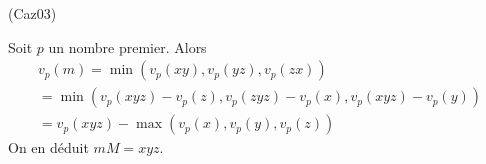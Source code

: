 \begin{tiny}(Caz03)\end{tiny} Soit $p$ un nombre premier. Alors
\begin{multline*}
 v_p(m) = \min(v_p(xy),v_p(yz),v_p(zx))\\
 = \min(v_p(xyz)-v_p(z),v_p(zyz)-v_p(x),v_p(xyz)-v_p(y))\\
 = v_p(xyz) - \max(v_p(x),v_p(y),v_p(z))
\end{multline*}
On en déduit $mM=xyz$.